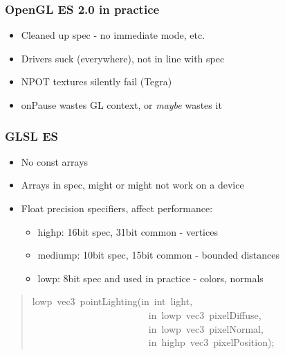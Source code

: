 \documentclass[ignorenonframetext]{beamer}
\begin{document}
\begin{frame}[fragile]
\frametitle{OpenGL ES 2.0 in practice}

\begin{itemize}

\item Cleaned up spec - no immediate mode, etc.

\item Drivers suck (everywhere), not in line with spec

\item NPOT textures silently fail (Tegra)

\item onPause wastes GL context, or \emph{maybe} wastes it
\end{itemize}
\end{frame}

\begin{frame}[fragile]
\frametitle{GLSL ES}

\begin{itemize}

\item No const arrays

\item Arrays in spec, might or might not work on a device

\item Float precision specifiers, affect performance:
\begin{itemize}

\item highp: 16bit spec, 31bit common - vertices

\item mediump: 10bit spec, 15bit common - bounded distances

\item lowp: 8bit spec and used in practice - colors, normals
\end{itemize}
\end{itemize}
%
\begin{quote}{\ttfamily \raggedright \noindent
lowp~vec3~pointLighting(in~int~light,\\
~~~~~~~~~~~~~~~~~~~~~~~~in~lowp~vec3~pixelDiffuse,\\
~~~~~~~~~~~~~~~~~~~~~~~~in~lowp~vec3~pixelNormal,\\
~~~~~~~~~~~~~~~~~~~~~~~~in~highp~vec3~pixelPosition);
}
\end{quote}
\end{frame}
\end{document}
